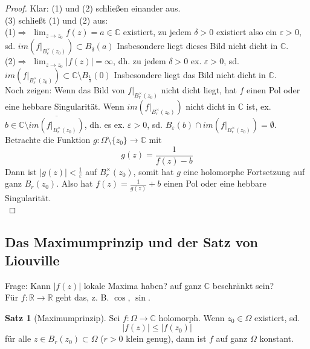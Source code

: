 \documentclass[11pt,titlepage]{article}
\theoremstyle{definition}
\newtheorem{theorem}{Satz}[section]
\theoremstyle{remark}
\begin{document}
	\begin{proof}
		Klar: (1) und (2) schließen einander aus. \\
		(3) schließt (1) und (2) aus: \\
		(1)$\Rightarrow$ $\lim_{z\to z_0} f(z)=a\in\mathbb{C}$ existiert, zu jedem $\delta >0$ existiert 
		also ein $\varepsilon >0$, sd. $im(f|_{B_{\varepsilon}^{\times}(z_0)})\subset B_{\delta}(a)$ 
		Insbesondere liegt dieses Bild nicht dicht in $\mathbb{C}$. \\
		(2)$\Rightarrow$ $\lim_{z\to z_0} |f(z)| =\infty$, dh. zu jedem $\delta >0$ ex. $\varepsilon >0$, 
		sd. $im(f|_{B_{\varepsilon}^{\times}(z_0)})\subset\mathbb{C}\setminus B_{\frac{1}{\delta}}(0)$ 
		Insbesondere liegt das Bild nicht dicht in $\mathbb{C}$. \\
		Noch zeigen: Wenn das Bild von $f|_{B_r^{\times} (z_0)}$ nicht dicht liegt, hat $f$ einen Pol 
		oder eine hebbare Singularität. Wenn $im(f|_{B_r^{\times}(z_0)})$ nicht dicht in 
		$\mathbb{C}$ ist, ex. $b\in\mathbb{C}\setminus\overline{im(f|_{B_r^{\times}(z_0)})}$, dh. es ex. 
		$\varepsilon >0$, sd. $B_{\varepsilon}(b)\cap im(f|_{B_r^{\times}(z_0)})=\emptyset.$ 
		Betrachte die Funktion $g:\Omega\setminus\{z_0\}\to\mathbb{C}$ mit 
		\[ g(z) =\frac{1}{f(z)-b} \]
		Dann ist $|g(z)| < \frac{1}{\varepsilon}$ auf $B_r^{\times}(z_0)$, somit hat $g$ eine holomorphe 
		Fortsetzung auf ganz $B_r (z_0)$. Also hat $f(z)=\frac{1}{g(z)}+b$ einen Pol oder eine 
		hebbare Singularität. \\
	\end{proof}
	
	\subsection{Das Maximumprinzip und der Satz von Liouville}
	
	Frage: Kann $|f(z)|$ lokale Maxima haben? auf ganz $\mathbb{C}$ beschränkt sein? \\
	Für $f:\mathbb{R}\to\mathbb{R}$ geht das, z. B. $\cos$, $\sin$. 
	
	\begin{theorem}[Maximumprinzip]
		Sei $f:\Omega\to\mathbb{C}$ holomorph. Wenn $z_0\in\Omega$ existiert, sd.
		\[ |f(z)|\leq |f(z_0)| \]
		für alle $z\in B_r (z_0)\subset\Omega$ ($r>0$ klein genug), dann ist $f$ auf ganz $\Omega$ 
		konstant.
	\end{theorem}
	
\end{document}
